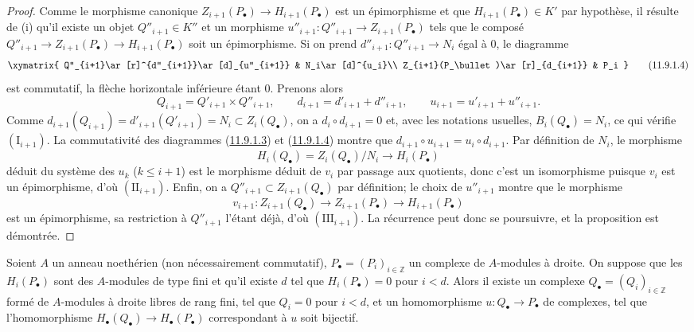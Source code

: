 \begin{proof}
Comme le morphisme canonique $Z_{i+1}(P_\bullet)\to H_{i+1}(P_\bullet)$ est
un épimorphisme et que $H_{i+1}(P_\bullet)\in K'$ par hypothèse, il résulte
de (i) qu'il existe un objet $Q''_{i+1}\in K''$ et un morphisme
$u''_{i+1}:Q''_{i+1}\to Z_{i+1}(P_\bullet)$ tels que le composé
$Q''_{i+1}\to Z_{i+1}(P_\bullet)\to H_{i+1}(P_\bullet)$ soit un
épimorphisme. Si on prend $d''_{i+1}:Q''_{i+1}\to N_i$ égal à $0$, le
diagramme
\[
\xymatrix{
Q''_{i+1}\ar[r]^{d''_{i+1}}\ar[d]_{u''_{i+1}} &
N_i\ar[d]^{u_i}\\
Z_{i+1}(P_\bullet)\ar[r]_{d_{i+1}} & P_i
}
\tag{11.9.1.4}\label{0.11.9.1.4-fr}
\]
est commutatif, la flèche horizontale inférieure étant $0$.
Prenons alors
\[
Q_{i+1}=Q'_{i+1}\times Q''_{i+1},\qquad
d_{i+1}=d'_{i+1}+d''_{i+1},\qquad
u_{i+1}=u'_{i+1}+u''_{i+1}.
\]
Comme $d_{i+1}(Q_{i+1})=d'_{i+1}(Q'_{i+1})=N_i\subset Z_i(Q_\bullet)$, on a
$d_i\circ d_{i+1}=0$ et, avec les notations usuelles,
$B_i(Q_\bullet)=N_i$, ce qui vérifie $(\mathrm I_{i+1})$. La commutativité
des diagrammes (\hyperref[0.11.9.1.3-fr]{11.9.1.3}) et
(\hyperref[0.11.9.1.4-fr]{11.9.1.4}) montre que
$d_{i+1}\circ u_{i+1}=u_i\circ d_{i+1}$. Par définition de $N_i$, le
morphisme
\[
H_i(Q_\bullet)=Z_i(Q_\bullet)/N_i\longrightarrow H_i(P_\bullet)
\]
déduit du système des $u_k$ ($k\leq i+1$) est le morphisme déduit de $v_i$
par passage aux quotients, donc c'est un isomorphisme puisque $v_i$ est un
épimorphisme, d'où $(\mathrm{II}_{i+1})$. Enfin, on a
$Q''_{i+1}\subset Z_{i+1}(Q_\bullet)$ par définition; le choix de
$u''_{i+1}$ montre que le morphisme
\[
v_{i+1}:Z_{i+1}(Q_\bullet)\longrightarrow Z_{i+1}(P_\bullet)
\longrightarrow H_{i+1}(P_\bullet)
\]
est un épimorphisme, sa restriction à $Q''_{i+1}$ l'étant déjà, d'où
$(\mathrm{III}_{i+1})$. La récurrence peut donc se poursuivre, et la
proposition est démontrée.
\end{proof}

\begin{corollary}[11.9.2]
\label{0.11.9.2-fr}
Soient $A$ un anneau noethérien (non nécessairement commutatif),
$P_\bullet=(P_i)_{i\in\mathbb Z}$ un complexe de $A$-modules à droite. On
suppose que les $H_i(P_\bullet)$ sont des $A$-modules de type fini et qu'il
existe $d$ tel que $H_i(P_\bullet)=0$ pour $i<d$. Alors il existe un complexe
$Q_\bullet=(Q_i)_{i\in\mathbb Z}$ formé de $A$-modules à droite libres de
rang fini, tel que $Q_i=0$ pour $i<d$, et un homomorphisme
$u:Q_\bullet\to P_\bullet$ de complexes, tel que l'homomorphisme
$H_\bullet(Q_\bullet)\to H_\bullet(P_\bullet)$ correspondant à $u$ soit
bijectif.
\end{corollary}

